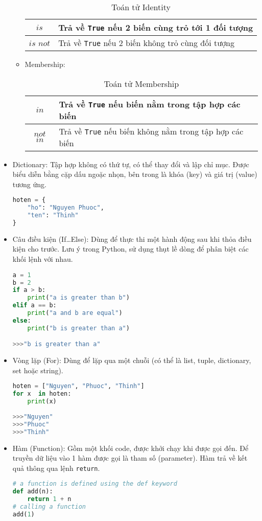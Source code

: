 \begin{itemize}
\begin{itemize}
\begin{table}[h!]
			\centering
			\begin{tabular}{|c|l|}
				\hline
				$is$ & Trả về \texttt{True} nếu 2 biến cùng trỏ tới 1 đối tượng\\
				\hline
				$is$ $not$ & Trả về \texttt{True} nếu 2 biến không trỏ cùng đối tượng\\
				\hline
			\end{tabular}
			\caption{Toán tử Identity}
		\end{table}
		\item Membership:
		\begin{table}[h!]
			\centering
			\begin{tabular}{|c|l|}
				\hline
				$in$ & Trả về \texttt{True} nếu biến nằm trong tập hợp các biến\\
				\hline
				$not$ $in$ & Trả về \texttt{True} nếu biến không nằm trong tập hợp các biến\\
				\hline
			\end{tabular}
			\caption{Toán tử Membership}
		\end{table}
	\end{itemize}
	\item Dictionary: Tập hợp không có thứ tự, có thể thay đổi và lập chỉ mục. Được biểu diễn bằng cặp dấu ngoặc nhọn, bên trong là khóa (key) và giá trị (value) tương ứng.
	\begin{lstlisting}[language=Python]
hoten = {
	"ho": "Nguyen Phuoc",
	"ten": "Thinh"
}
	\end{lstlisting}
	\item Câu điều kiện (If\ldots Else): Dùng để thực thi một hành động sau khi thỏa điều kiện cho trước. Lưu ý trong Python, sử dụng thụt lề dòng để phân biệt các khối lệnh với nhau.
	\begin{lstlisting}[language=Python]
a = 1
b = 2
if a > b:
	print("a is greater than b")
elif a == b:
	print("a and b are equal")
else:
	print("b is greater than a")

>>>"b is greater than a"
	\end{lstlisting}
	\item Vòng lặp (For): Dùng để lặp qua một chuỗi (có thể là list, tuple, dictionary, set hoặc string).
	\begin{lstlisting}[language=Python]
hoten = ["Nguyen", "Phuoc", "Thinh"]
for x  in hoten:
	print(x)
	
>>>"Nguyen"
>>>"Phuoc"
>>>"Thinh"
	\end{lstlisting}
	\item Hàm (Function): Gồm một khối code, được khởi chạy khi được gọi đến. Để truyền dữ liệu vào 1 hàm được gọi là tham số (parameter). Hàm trả về kết quả thông qua lệnh \texttt{return}.
	\begin{lstlisting}[language=Python]
# a function is defined using the def keyword
def add(n):
	return 1 + n
# calling a function
add(1)


\end{lstlisting}
\end{itemize}
